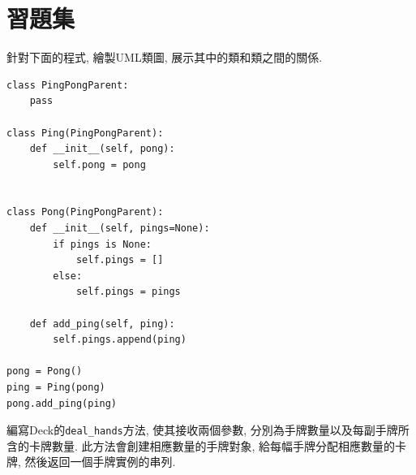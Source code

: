 \documentclass[10pt]{book}
\begin{document}
\section{習題集}

\begin{exercise}
針對下面的程式, 繪製UML類圖, 展示其中的類和類之間的關係. 

\begin{verbatim}
class PingPongParent:
    pass

class Ping(PingPongParent):
    def __init__(self, pong):
        self.pong = pong


class Pong(PingPongParent):
    def __init__(self, pings=None):
        if pings is None:
            self.pings = []
        else:
            self.pings = pings

    def add_ping(self, ping):
        self.pings.append(ping)

pong = Pong()
ping = Ping(pong)
pong.add_ping(ping)
\end{verbatim}


\end{exercise}



\begin{exercise}
編寫Deck的\verb"deal_hands"方法, 使其接收兩個參數, 分別為手牌數量以及每副手牌所含的卡牌數量. 
此方法會創建相應數量的手牌對象, 給每幅手牌分配相應數量的卡牌, 然後返回一個手牌實例的串列. 
\end{exercise}
\end{document}
